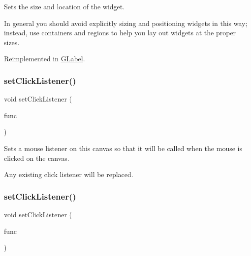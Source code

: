 Sets the size and location of the widget. 

In general you should avoid explicitly sizing and positioning widgets in this way; instead, use containers and regions to help you lay out widgets at the proper sizes. 

Reimplemented in \mbox{\hyperlink{classGLabel_a3ed96c7e7adaf111848a90978621066c}{G\+Label}}.

\mbox{\label{classGCanvas_abd40af6921242584d0954f173911b190}} 
\subsubsection{\texorpdfstring{set\+Click\+Listener()}{setClickListener()}\hspace{0.1cm}{\footnotesize\ttfamily [1/2]}}
{\footnotesize\ttfamily void set\+Click\+Listener (\begin{DoxyParamCaption}\item[{G\+Event\+Listener}]{func }\end{DoxyParamCaption})\hspace{0.3cm}{\ttfamily [virtual]}}



Sets a mouse listener on this canvas so that it will be called when the mouse is clicked on the canvas. 

Any existing click listener will be replaced. \mbox{\label{classGCanvas_a856414c92df90f56f3877475eb3f8fc4}} 
\subsubsection{\texorpdfstring{set\+Click\+Listener()}{setClickListener()}\hspace{0.1cm}{\footnotesize\ttfamily [2/2]}}
{\footnotesize\ttfamily void set\+Click\+Listener (\begin{DoxyParamCaption}\item[{G\+Event\+Listener\+Void}]{func }\end{DoxyParamCaption})\hspace{0.3cm}{\ttfamily [virtual]}}



